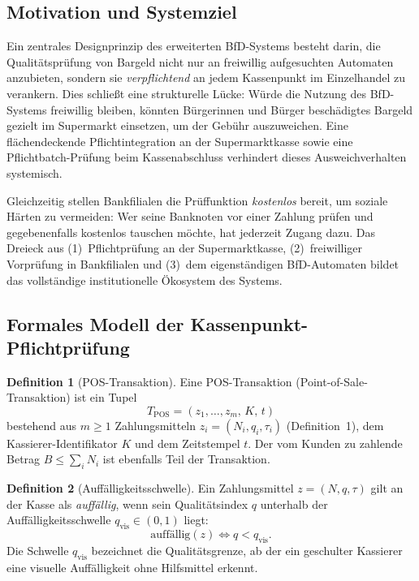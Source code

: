 ﻿\documentclass[a4paper,12pt]{article}
\theoremstyle{definition}
\newtheorem{definition}{Definition}
\begin{document}
\subsection{Motivation und Systemziel}

Ein zentrales Designprinzip des erweiterten BfD-Systems besteht darin,
die Qualitätsprüfung von Bargeld nicht nur an freiwillig aufgesuchten
Automaten anzubieten, sondern sie \emph{verpflichtend} an jedem Kassenpunkt
im Einzelhandel zu verankern.  Dies schließt eine strukturelle Lücke:
Würde die Nutzung des BfD-Systems freiwillig bleiben, könnten Bürgerinnen und
Bürger beschädigtes Bargeld gezielt im Supermarkt einsetzen, um der Gebühr
auszuweichen.  Eine flächendeckende Pflichtintegration an der Supermarktkasse
sowie eine Pflichtbatch-Prüfung beim Kassenabschluss verhindert dieses
Ausweichverhalten systemisch.

Gleichzeitig stellen Bankfilialen die Prüffunktion \emph{kostenlos} bereit,
um soziale Härten zu vermeiden: Wer seine Banknoten vor einer Zahlung prüfen
und gegebenenfalls kostenlos tauschen möchte, hat jederzeit Zugang dazu.
Das Dreieck aus (1)~Pflichtprüfung an der Supermarktkasse,
(2)~freiwilliger Vorprüfung in Bankfilialen und
(3)~dem eigenständigen BfD-Automaten bildet das vollständige institutionelle
Ökosystem des Systems.

\subsection{Formales Modell der Kassenpunkt-Pflichtprüfung}

\begin{definition}[POS-Transaktion]
\label{def:pos}
Eine POS-Transaktion (Point-of-Sale-Transaktion) ist ein Tupel
\[
T_{\text{POS}} = (z_1,\ldots,z_m,\, K,\, t)
\]
bestehend aus $m \geq 1$ Zahlungsmitteln $z_i = (N_i, q_i, \tau_i)$
(Definition~1), dem Kassierer-Identifikator $K$ und dem Zeitstempel $t$.
Der vom Kunden zu zahlende Betrag $B \leq \sum_i N_i$ ist ebenfalls Teil
der Transaktion.
\end{definition}

\begin{definition}[Auffälligkeitsschwelle]
\label{def:auffaellig}
Ein Zahlungsmittel $z = (N, q, \tau)$ gilt an der Kasse als
\emph{auffällig}, wenn sein Qualitätsindex $q$ unterhalb der
Auffälligkeitsschwelle $q_{\text{vis}} \in (0,1)$ liegt:
\[
\text{auffällig}(z) \iff q < q_{\text{vis}}.
\]
Die Schwelle $q_{\text{vis}}$ bezeichnet die Qualitätsgrenze, ab der ein
geschulter Kassierer eine visuelle Auffälligkeit ohne Hilfsmittel erkennt.
\end{definition}
\end{document}
